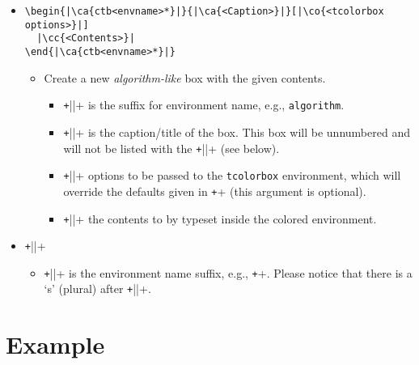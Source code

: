 \documentclass{article}
\begin{document}
\begin{itemize}
 \item \begin{verbatim}
\begin{|\ca{ctb<envname>*}|}{|\ca{<Caption>}|}[|\co{<tcolorbox options>}|]
  |\cc{<Contents>}|
\end{|\ca{ctb<envname>*}|}
\end{verbatim}
  \begin{itemize}
    \item Create a new \emph{algorithm-like} box with the given contents.
    \begin{itemize}
      \item \texttt+||+ is the suffix for environment name,
            e.g., \verb+algorithm+.
      \item \texttt+||+ is the caption/title of
            the box.  This box will be unnumbered and will not be listed with the
            \texttt+\cthlistof||+
            (see below).
      \item \texttt+||+ options to be
            passed to the \verb+tcolorbox+ environment, which will override the defaults
            given in \texttt+\cthnewalgorithm+  (this argument is optional).
      \item \texttt+||+ the contents to by typeset inside the colored environment.
    \end{itemize}
  \end{itemize}

  \item \texttt+\cthlistof||+
  \begin{itemize}
      \item \texttt+||+ is the environment name
            suffix, e.g., \texttt+\cthlistofalgorithms+.
            Please notice that there is a `s' (plural) after
            \texttt+||+.
  \end{itemize}
\end{itemize}

\section{Example}
\label{sec:examples}
\end{document}
